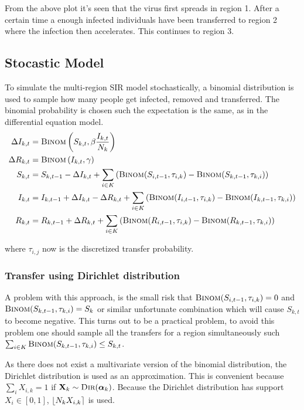 From the above plot it's seen that the virus first spreads in region 1. After a certain time a enough infected individuals have been transferred to region 2 where the infection then accelerates. This continues to region 3.

\subsection{Stocastic Model}

To simulate the multi-region SIR model stochastically, a binomial distribution is used to sample how many people get infected, removed and transferred. The binomial probability is chosen such the expectation is the same, as in the differential equation model.
\begin{equation*}
\begin{aligned}
\Delta I_{k,t} &= \textsc{Binom}\left(S_{k,t}, \beta \frac{I_{k, t}}{N_k}\right) \\
\Delta R_{k,t} &= \textsc{Binom}\left(I_{k,t}, \gamma\right) \\
S_{k,t} &= S_{k,t-1} - \Delta I_{k,t} + \sum_{i \in K} \left(\textsc{Binom}(S_{i,t-1}, \tau_{i,k}) - \textsc{Binom}(S_{k,t-1}, \tau_{k,i})\right) \\
I_{k,t} &= I_{k,t-1} + \Delta I_{k,t} - \Delta R_{k, t} + \sum_{i \in K} \left(\textsc{Binom}(I_{i,t-1}, \tau_{i,k}) - \textsc{Binom}(I_{k,t-1}, \tau_{k,i})\right) \\
R_{k,t} &= R_{k,t-1} + \Delta R_{k, t} + \sum_{i \in K} \left(\textsc{Binom}(R_{i,t-1}, \tau_{i,k}) - \textsc{Binom}(R_{k,t-1}, \tau_{k,i})\right)
\end{aligned}
\end{equation*}

where $\tau_{i,j}$ now is the discretized transfer probability.

\subsubsection{Transfer using Dirichlet distribution}
A problem with this approach, is the small risk that $\textsc{Binom}(S_{i, t-1}, \tau_{i,k}) = 0$ and $\textsc{Binom}(S_{k, t-1}, \tau_{k,i}) = S_k$ or similar unfortunate combination which will cause $S_{k,t}$ to become negative. This turns out to be a practical problem, to avoid this problem one should sample all the transfers for a region simultaneously such $\sum_{i \in K} \textsc{Binom}(S_{k,t-1}, \tau_{k,i}) \le S_{k, t}$.

As there does not exist a multivariate version of the binomial distribution, the Dirichlet distribution is used as an approximation. This is convenient because $\sum_{i} X_{i,k} = 1$ if $\mathbf{X}_k \sim \textsc{Dir}(\boldsymbol{\alpha}_k)$. Because the Dirichlet distribution has support $X_i \in [0, 1]$, $\iround*{N_k X_{i,k}}$ is used.

